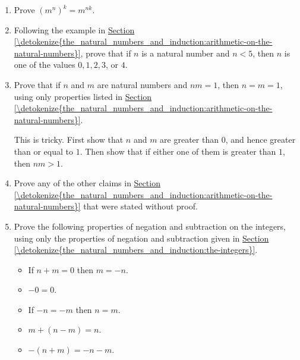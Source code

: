 \documentclass[letterpaper,10pt,english]{sphinxmanual}
\begin{document}
\begin{enumerate}
\item {} 
\sphinxAtStartPar
Prove \((m^n)^k = m^{nk}\).

\item {} 
\sphinxAtStartPar
Following the example in \hyperref[\detokenize{the_natural_numbers_and_induction:arithmetic-on-the-natural-numbers}]{Section \ref{\detokenize{the_natural_numbers_and_induction:arithmetic-on-the-natural-numbers}}}, prove that if \(n\) is a natural number and \(n < 5\), then \(n\) is one of the values \(0, 1, 2, 3\), or \(4\).

\item {} 
\sphinxAtStartPar
Prove that if \(n\) and \(m\) are natural numbers and \(n m = 1\), then \(n = m = 1\), using only properties listed in \hyperref[\detokenize{the_natural_numbers_and_induction:arithmetic-on-the-natural-numbers}]{Section \ref{\detokenize{the_natural_numbers_and_induction:arithmetic-on-the-natural-numbers}}}.

\sphinxAtStartPar
This is tricky. First show that \(n\) and \(m\) are greater than \(0\), and hence greater than or equal to \(1\). Then show that if either one of them is greater than \(1\), then \(n m > 1\).

\item {} 
\sphinxAtStartPar
Prove any of the other claims in \hyperref[\detokenize{the_natural_numbers_and_induction:arithmetic-on-the-natural-numbers}]{Section \ref{\detokenize{the_natural_numbers_and_induction:arithmetic-on-the-natural-numbers}}} that were stated without proof.

\item {} 
\sphinxAtStartPar
Prove the following properties of negation and subtraction on the integers, using only the properties of negation and subtraction given in \hyperref[\detokenize{the_natural_numbers_and_induction:the-integers}]{Section \ref{\detokenize{the_natural_numbers_and_induction:the-integers}}}.
\begin{itemize}
\item {} 
\sphinxAtStartPar
If \(n + m = 0\) then \(m = -n\).

\item {} 
\sphinxAtStartPar
\(-0 = 0\).

\item {} 
\sphinxAtStartPar
If \(-n = -m\) then \(n = m\).

\item {} 
\sphinxAtStartPar
\(m + (n - m) = n\).

\item {} 
\sphinxAtStartPar
\(-(n + m) = -n - m\).


\end{itemize}
\end{enumerate}
\end{document}

